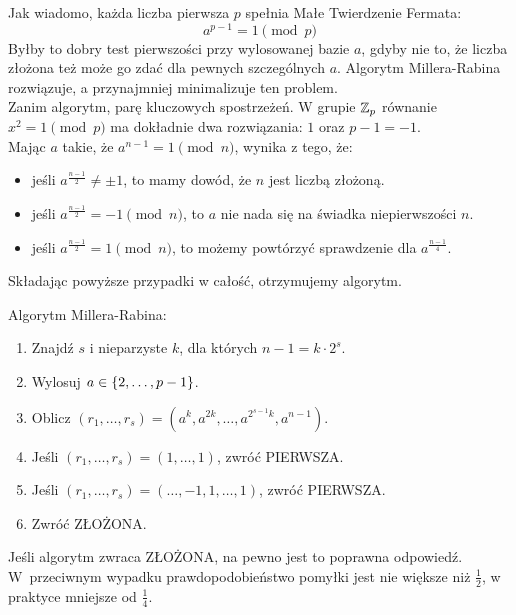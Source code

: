 Jak wiadomo, każda liczba pierwsza \( p \) spełnia Małe Twierdzenie Fermata: \[ a^{p-1} = 1 \pmod{p} \] Byłby to dobry test pierwszości przy wylosowanej bazie \( a \), gdyby nie to, że liczba złożona też może go zdać dla pewnych szczególnych \( a \). Algorytm Millera-Rabina rozwiązuje, a przynajmniej minimalizuje ten problem. \\
Zanim algorytm, parę kluczowych spostrzeżeń. W grupie \( \mathbb{Z}_p \) równanie \( x^2 = 1 \pmod{p} \) ma dokładnie dwa rozwiązania: \( 1 \) oraz \( p - 1 = -1 \). \\
Mając \( a \) takie, że \( a^{n-1} = 1 \pmod{n} \), wynika z tego, że:
\begin{itemize}
    \item jeśli \( a^{\frac{n-1}{2}} \neq \pm 1 \), to mamy dowód, że \( n \) jest liczbą złożoną.
    \item jeśli \( a^{\frac{n-1}{2}} = -1 \pmod{n} \), to \( a \) nie nada się na świadka niepierwszości \( n \).
    \item jeśli \( a^{\frac{n-1}{2}} = 1 \pmod{n} \), to możemy powtórzyć sprawdzenie dla \( a^{\frac{n-1}{4}}\).
\end{itemize}
Składając powyższe przypadki w całość, otrzymujemy algorytm.
\begin{greyframe}
    Algorytm Millera-Rabina:
    \begin{enumerate}
        \item Znajdź \( s \) i nieparzyste \( k \), dla których \( n-1 = k \cdot 2^s \).
        \item Wylosuj \( a \in \set{2, \dots, p - 1} \).
        \item Oblicz \( (r_1, \dots, r_s ) = (a^k, a^{2k}, \dots, a^{2^{s-1}k}, a^{n-1}) \).
        \item Jeśli \( (r_1, \dots, r_s) = (1, \dots, 1) \), zwróć PIERWSZA.
        \item Jeśli \( (r_1, \dots, r_s) = (\dots, -1, 1, \dots, 1) \), zwróć PIERWSZA.
        \item Zwróć ZŁOŻONA.
    \end{enumerate}
\end{greyframe}
Jeśli algorytm zwraca ZŁOŻONA, na pewno jest to poprawna odpowiedź. W~przeciwnym wypadku prawdopodobieństwo pomyłki jest nie większe niż \( \frac{1}{2} \), w praktyce mniejsze od \( \frac{1}{4} \).

